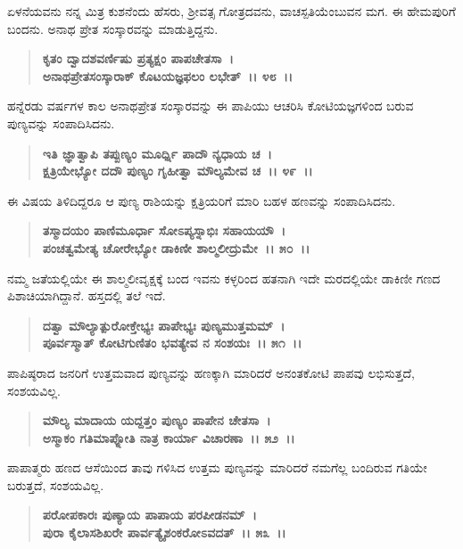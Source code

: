 ಏಳನೆಯವನು ನನ್ನ ಮಿತ್ರ ಕುಶನೆಂದು ಹೆಸರು, ಶ‍್ರೀವತ್ಸ ಗೋತ್ರದವನು, ವಾಚಸ್ಪತಿಯೆಂಬುವನ ಮಗ. ಈ ಹೇಮಪುರಿಗೆ ಬಂದನು. ಅನಾಥ ಪ್ರೇತ ಸಂಸ್ಕಾರವನ್ನು ಮಾಡುತ್ತಿದ್ದನು.

\begin{verse}
\textbf{ಕೃತಂ ದ್ವಾದಶವರ್ಣಿಷು ಪ್ರತ್ಯಕ್ಷಂ ಪಾಪಚೇತಸಾ~।}\\\textbf{ಅನಾಥಪ್ರೇತಸಂಸ್ಕಾರಾಕ್ ಕೊಟಯಜ್ಞಫಲಂ ಲಭೇತ್~।। ೪೮~।।}
\end{verse}

ಹನ್ನೆರಡು ವರ್ಷಗಳ ಕಾಲ ಅನಾಥಪ್ರೇತ ಸಂಸ್ಕಾರವನ್ನು ಈ ಪಾಪಿಯು ಆಚರಿಸಿ ಕೋಟಿಯಜ್ಞಗಳಿಂದ ಬರುವ ಪುಣ್ಯವನ್ನು ಸಂಪಾದಿಸಿದನು.

\begin{verse}
\textbf{ಇತಿ ಜ್ಞಾತ್ವಾಪಿ ತಪ್ಪುಣ್ಯಂ ಮೂರ್ಧ್ನಿ ಪಾದೌ ನ್ಯಧಾಯ ಚ~।}\\\textbf{ಕ್ಷತ್ರಿಯೇಭ್ಯೋ ದದೌ ಪುಣ್ಯಂ ಗೃಹೀತ್ವಾ ಮೌಲ್ಯಮೇವ ಚ~।। ೪೯~।। }
\end{verse}

ಈ ವಿಷಯ ತಿಳಿದಿದ್ದರೂ ಆ ಪುಣ್ಯ ರಾಶಿಯನ್ನು ಕ್ಷತ್ರಿಯರಿಗೆ ಮಾರಿ ಬಹಳ ಹಣವನ್ನು ಸಂಪಾದಿಸಿದನು.

\begin{verse}
\textbf{ತಸ್ಮಾದಯಂ ಪಾಣಿಮೂರ್ಧಾ ಸೋಽಪ್ಯಸ್ನಾಭಿಃ ಸಹಾಯಯೌ~।}\\\textbf{ಪಂಚತ್ವಮೇತ್ಯ ಚೋರೇಭ್ಯೋ ಡಾಕಿಣೀ ಶಾಲ್ಮಲೀದ್ರುಮೇ~।। ೫೦~।। }
\end{verse}

ನಮ್ಮ ಜತೆಯಲ್ಲಿಯೇ ಈ ಶಾಲ್ಮಲೀವೃಕ್ಷಕ್ಕೆ ಬಂದ ಇವನು ಕಳ್ಳರಿಂದ ಹತನಾಗಿ ಇದೇ ಮರದಲ್ಲಿಯೇ ಡಾಕಿಣೀ ಗಣದ ಪಿಶಾಚಿಯಾಗಿದ್ದಾನೆ. ಹಸ್ತದಲ್ಲಿ ತಲೆ ಇದೆ.

\begin{verse}
\textbf{ದತ್ವಾ ಮೌಲ್ಯಾತ್ಪುರೋಕ್ತೇಭ್ಯಃ ಪಾಪೇಭ್ಯಃ ಪುಣ್ಯಮುತ್ತಮಮ್~।}\\\textbf{ಪೂರ್ವಸ್ಮಾತ್ ಕೋಟಿಗುಣಿತಂ ಭವತ್ಯೇವ ನ ಸಂಶಯಃ~।। ೫೧~।।}
\end{verse}

ಪಾಪಿಷ್ಠರಾದ ಜನರಿಗೆ ಉತ್ತಮವಾದ ಪುಣ್ಯವನ್ನು ಹಣಕ್ಕಾಗಿ ಮಾರಿದರೆ ಅನಂತಕೋಟಿ ಪಾಪವು ಲಭಿಸುತ್ತದೆ, ಸಂಶಯವಿಲ್ಲ.

\begin{verse}
\textbf{ಮೌಲ್ಯ ಮಾದಾಯ ಯದ್ದತ್ತಂ ಪುಣ್ಯಂ ಪಾಪೇನ ಚೇತಸಾ~।}\\\textbf{ಅಸ್ಮಾಕಂ ಗತಿಮಾಪ್ನೋತಿ ನಾತ್ರ ಕಾರ್ಯಾ ವಿಚಾರಣಾ~।। ೫೨~।। }
\end{verse}

ಪಾಪಾತ್ಮರು ಹಣದ ಆಸೆಯಿಂದ ತಾವು ಗಳಿಸಿದ ಉತ್ತಮ ಪುಣ್ಯವನ್ನು ಮಾರಿದರೆ ನಮಗೆಲ್ಲ ಬಂದಿರುವ ಗತಿಯೇ ಬರುತ್ತದೆ, ಸಂಶಯವಿಲ್ಲ.

\begin{verse}
\textbf{ಪರೋಪಕಾರಃ ಪುಣ್ಯಾಯ ಪಾಪಾಯ ಪರಪೀಡನಮ್~।}\\\textbf{ಪುರಾ ಕೈಲಾಸಶಿಖರೇ ಪಾರ್ವತ್ಯೈಶಂಕರೋಽವದತ್~।। ೫೩~।। }
\end{verse}

